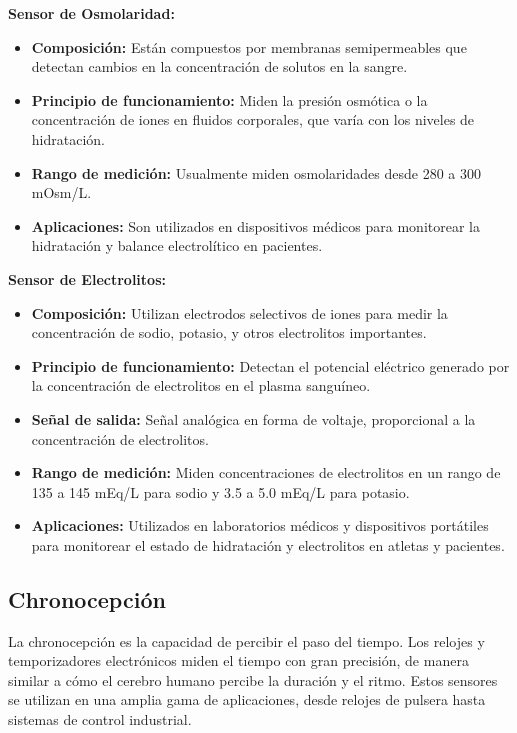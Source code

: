 \documentclass[conference]{IEEEtran}
\begin{document}
\textbf{Sensor de Osmolaridad:}
\begin{itemize}
    \item \textbf{Composición:} Están compuestos por membranas semipermeables que detectan cambios en la concentración de solutos en la sangre.
    \item \textbf{Principio de funcionamiento:} Miden la presión osmótica o la concentración de iones en fluidos corporales, que varía con los niveles de hidratación.
    
    \item \textbf{Rango de medición:} Usualmente miden osmolaridades desde 280 a 300 mOsm/L.
    \item \textbf{Aplicaciones:} Son utilizados en dispositivos médicos para monitorear la hidratación y balance electrolítico en pacientes.
\end{itemize}
\textbf{Sensor de Electrolitos:}
\begin{itemize}
    \item \textbf{Composición:} Utilizan electrodos selectivos de iones para medir la concentración de sodio, potasio, y otros electrolitos importantes.
    \item \textbf{Principio de funcionamiento:} Detectan el potencial eléctrico generado por la concentración de electrolitos en el plasma sanguíneo.
    \item \textbf{Señal de salida:} Señal analógica en forma de voltaje, proporcional a la concentración de electrolitos.
    \item \textbf{Rango de medición:} Miden concentraciones de electrolitos en un rango de 135 a 145 mEq/L para sodio y 3.5 a 5.0 mEq/L para potasio.
    \item \textbf{Aplicaciones:} Utilizados en laboratorios médicos y dispositivos portátiles para monitorear el estado de hidratación y electrolitos en atletas y pacientes.
\end{itemize}

\subsection{Chronocepción}

La chronocepción es la capacidad de percibir el paso del tiempo. Los relojes y temporizadores electrónicos miden el tiempo con gran precisión, de manera similar a cómo el cerebro humano percibe la duración y el ritmo. Estos sensores se utilizan en una amplia gama de aplicaciones, desde relojes de pulsera hasta sistemas de control industrial.\\
\end{document}
